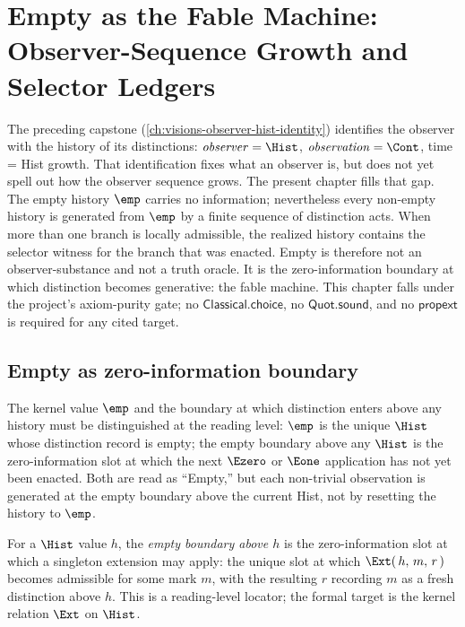 \chapter{Empty as the Fable Machine: Observer-Sequence Growth and Selector Ledgers}
\label{ch:visions-empty-fable-machine}

The preceding capstone (\autoref{ch:visions-observer-hist-identity}) identifies the observer with the history of its distinctions: $\mathit{observer} = \Hist$, $\mathit{observation} = \Cont$, time = Hist growth. That identification fixes what an observer is, but does not yet spell out how the observer sequence grows. The present chapter fills that gap. The empty history $\emp$ carries no information; nevertheless every non-empty history is generated from $\emp$ by a finite sequence of distinction acts. When more than one branch is locally admissible, the realized history contains the selector witness for the branch that was enacted. Empty is therefore not an observer-substance and not a truth oracle. It is the zero-information boundary at which distinction becomes generative: the fable machine. This chapter falls under the project's axiom-purity gate; no $\mathsf{Classical.choice}$, no $\mathsf{Quot.sound}$, and no $\mathsf{propext}$ is required for any cited target.

\section{Empty as zero-information boundary}
\label{sec:efm-empty-vs-e}

The kernel value $\emp$ and the boundary at which distinction enters above any history must be distinguished at the reading level: $\emp$ is the unique $\Hist$ whose distinction record is empty; the empty boundary above any $\Hist$ is the zero-information slot at which the next $\Ezero$ or $\Eone$ application has not yet been enacted. Both are read as ``Empty,'' but each non-trivial observation is generated at the empty boundary above the current Hist, not by resetting the history to $\emp$.

\begin{definition}
\label{def:efm-empty-boundary}
For a $\Hist$ value $h$, the \emph{empty boundary above $h$} is the zero-information slot at which a singleton extension may apply: the unique slot at which $\Ext(\,h,\,m,\,r\,)$ becomes admissible for some mark $m$, with the resulting $r$ recording $m$ as a fresh distinction above $h$. This is a reading-level locator; the formal target is the kernel relation $\Ext$ on $\Hist$.
\end{definition}

